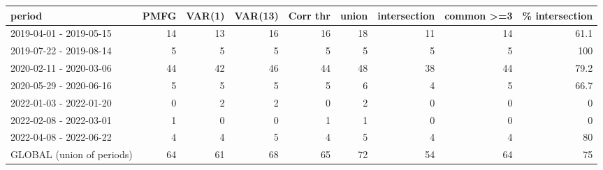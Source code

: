 \begin{tabular}{lrrrrrrrr}
\toprule
period & PMFG & VAR(1) & VAR(13) & Corr thr & union & intersection & common >=3 & \% intersection \\
\midrule
2019-04-01 - 2019-05-15 & 14 & 13 & 16 & 16 & 18 & 11 & 14 & 61.1 \\
2019-07-22 - 2019-08-14 & 5 & 5 & 5 & 5 & 5 & 5 & 5 & 100 \\
2020-02-11 - 2020-03-06 & 44 & 42 & 46 & 44 & 48 & 38 & 44 & 79.2 \\
2020-05-29 - 2020-06-16 & 5 & 5 & 5 & 5 & 6 & 4 & 5 & 66.7 \\
2022-01-03 - 2022-01-20 & 0 & 2 & 2 & 0 & 2 & 0 & 0 & 0 \\
2022-02-08 - 2022-03-01 & 1 & 0 & 0 & 1 & 1 & 0 & 0 & 0 \\
2022-04-08 - 2022-06-22 & 4 & 4 & 5 & 4 & 5 & 4 & 4 & 80 \\
GLOBAL (union of periods) & 64 & 61 & 68 & 65 & 72 & 54 & 64 & 75 \\
\bottomrule
\end{tabular}
